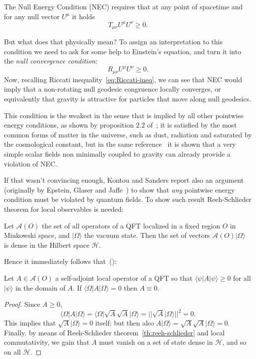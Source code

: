 \begin{definition}
    \label{def:NEC}
    The Null Energy Condition (NEC) requires that at any point of spacetime and for any null vector \(U^{\mu}\) it holds
    \[
    T_{\mu\nu}U^{\mu}U^{\nu} \ge 0.
    \]
\end{definition}
But what does that physically mean? To assign an interpretation to this condition we need to ask for some help to Einstein's equation, and turn it into the \emph{null convergence condition}:
\[
    R_{\mu\nu}U^{\mu}U^{\nu} \ge 0. 
\]
Now, recalling Riccati inequality~\eqref{eq:Riccati-ineq}, we can see that NEC would imply that a non-rotating null geodesic congruence locally converges, or equivalently that gravity is attractive for particles that move along null geodesics.

\noindent This condition is the weakest in the sense that is implied by all other pointwise energy conditions, as shown by proposition \(2.2\) of~\cite{kontou2020energy}; it is satisfied by the most common forms of matter in the universe, such as dust, radiation and saturated by the cosmological constant, but in the same reference~\cite{kontou2020energy} it is shown that a very simple scalar fields non minimally coupled to gravity can already provide a violation of NEC.

If that wasn't convincing enough, Kontou and Sanders report also an argument (originally by Epstein, Glaser and Jaffe~\cite{epstein1965nonpositivity}) to show that \emph{any} pointwise energy condition must be violated by quantum fields. To show such result Reeh-Schlieder theorem for local observables is needed:
\begin{theorem}
    \label{th:reeh-schlieder}
    Let \(\mathcal{A}(O)\) the set of all operators of a QFT localized in a fixed region \(O\) in Minkowski space, and \(\vert \Omega \rangle\) the vacuum state. Then the set of vectors \(\mathcal{A}(O)\vert \Omega \rangle\) is dense in the Hilbert space \(\mathcal{H}\).
\end{theorem}

Hence it immediately follows that~(\cite{epstein1965nonpositivity}):
\begin{theorem}
    \label{th:quantum-violation-pointwise-conditions}
    Let \(A\in \mathcal{A}(O)\) a self-adjoint local operator of a QFT so that \(\langle \psi\vert A\vert\psi\rangle\ge 0\) for all \(\vert\psi\rangle\) in the domain of \(A\). If \(\langle \Omega\vert A\vert\Omega\rangle = 0\) then \(A \equiv 0\).
\end{theorem}
\begin{proof}
    Since \(A\ge 0\), 
    \[
        \langle \Omega\vert A\vert\Omega\rangle = \langle \Omega\vert \sqrt{A}\sqrt{A}\vert\Omega\rangle = \vert\vert \sqrt{A}\vert\Omega\rangle\vert\vert^2 = 0.
    \] 
    This implies that \(\sqrt{A}\vert\Omega\rangle = 0\) itself; but then also \(A\vert\Omega\rangle = \sqrt{A}\sqrt{A}\vert\Omega\rangle = 0\). Finally, by means of Reeh-Schlieder theorem~\ref{th:reeh-schlieder} and local commutativity, we gain that \(A\) must vanish on a set of state dense in \(\mathcal{H}\), and so on all \(\mathcal{H}\).
\end{proof}

